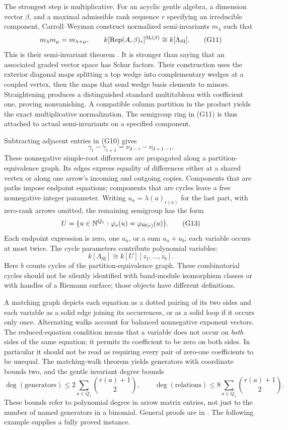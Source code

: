 The strongest step is multiplicative. For an acyclic gentle algebra, a dimension vector \(\beta\), and a maximal admissible rank sequence \(r\) specifying an irreducible component, Carroll--Weyman construct normalized semi-invariants \(m_\lambda\) such that
\[
 m_\lambda m_\mu=m_{\lambda+\mu},\qquad
 k[\operatorname{Rep}(A,\beta)_r]^{\operatorname{SL}(\beta)}
       \cong k[\Lambda_{\mathrm{SI}}].
 \tag{G11}\label{eq:gentle-semigroup}
\]
This is their semi-invariant theorem \citep[Theorem 6.10]{smtCW2011}. It is stronger than saying that an associated graded vector space has Schur factors. Their construction uses the exterior diagonal maps splitting a top wedge into complementary wedges at a coupled vertex, then the maps that send wedge basis elements to minors. Straightening produces a distinguished standard multitableau with coefficient one, proving nonvanishing. A compatible column partition in the product yields the exact multiplicative normalization. The semigroup ring in (G11) is thus attached to actual semi-invariants on a specified component.

Subtracting adjacent entries in (G10) gives
\[
 \gamma_i-\gamma_{i+1}
       =\nu_{d-i}-\nu_{d+1-i}.
 \tag{G12}
\]
These nonnegative simple-root differences are propagated along a partition-equivalence graph. Its edges express equality of differences either at a shared vertex or along one arrow's incoming and outgoing copies. Components that are paths impose endpoint equations; components that are cycles leave a free nonnegative integer parameter. Writing \(u_a=\lambda(a)_{r(a)}\) for the last part, with zero-rank arrows omitted, the remaining semigroup has the form
\[
 U=\{u\in\mathbb{N}^{Q_1}:\varphi_e(u)=\varphi_{\Theta(e)}(u)\}.
 \tag{G13}
\]
Each endpoint expression is zero, one \(u_a\), or a sum \(u_a+u_b\); each variable occurs at most twice. The cycle parameters contribute polynomial variables:
\[
 k[\Lambda_{\mathrm{SI}}]\cong k[U][z_1,\ldots,z_b].
 \tag{G14}
\]
Here \(b\) counts cycles of the partition-equivalence graph. These combinatorial cycles should not be silently identified with band-module isomorphism classes or with handles of a Riemann surface; those objects have different definitions.

A matching graph depicts each equation as a dotted pairing of its two sides and each variable as a solid edge joining its occurrences, or as a solid loop if it occurs only once. Alternating walks account for balanced nonnegative exponent vectors. The reduced-equation condition means that a variable does not occur on \emph{both} sides of the same equation; it permits its coefficient to be zero on both sides. In particular it should not be read as requiring every pair of zero-one coefficients to be unequal. The matching-walk theorem yields generators with coordinate bounds two, and the gentle invariant degree bounds
\[
 \deg(\text{generators})\le 2\sum_{a\in Q_1}\binom{r(a)+1}{2},
 \qquad
 \deg(\text{relations})\le 8\sum_{a\in Q_1}\binom{r(a)+1}{2}.
 \tag{G15}
\]
These bounds refer to polynomial degree in arrow matrix entries, not just to the number of named generators in a binomial. General proofs are in \citet[Sections 7--9]{smtCW2011}. The following example supplies a fully proved instance.


